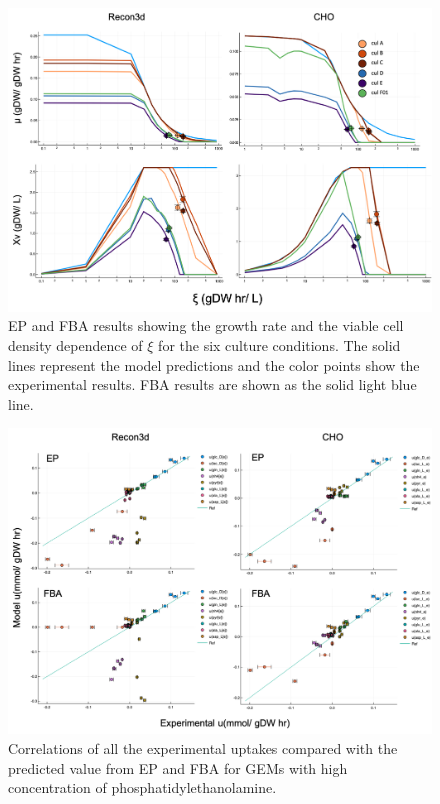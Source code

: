 	\begin{figure}[h]
		\includegraphics[scale = 0.5]{rich_medium_1}
		\caption{EP and FBA results showing the growth rate and the viable cell density dependence of $\xi$ for the six culture conditions. The solid lines represent the model predictions and the color points show the experimental results. FBA results are shown as the solid light blue line.}
		
	\end{figure}
	
	\begin{figure}[h]
		\includegraphics[scale = 0.5]{rich_medium_2}
		\caption{Correlations of all the experimental uptakes compared with the predicted value from EP and FBA for GEMs with high concentration of phosphatidylethanolamine.}
		
	\end{figure}
	
